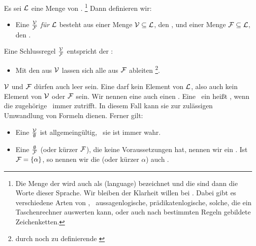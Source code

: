 Es sei $\mathcal{L}$ eine Menge von .%
	\footnote{%
	Die Menge der  wird auch als  (language) bezeichnet und die  sind dann die Worte dieser Sprache.
	Wir bleiben der Klarheit willen bei .
	Dabei gibt es verschiedene Arten von , \textzB\ aussagenlogische, prädikatenlogische, solche, die ein Taschenrechner auswerten kann, oder auch nach bestimmten Regeln gebildete Zeichenketten.
}
Dann definieren wir:
\begin{itemize}
	\item[] Eine  $\frac{\mathcal{V}}{\mathcal{F}}$ \emph{für} $\mathcal{L}$ besteht aus einer Menge $\mathcal{V}\subseteq\mathcal{L}$, den , und einer Menge $\mathcal{F}\subseteq\mathcal{L}$, den .
\end{itemize}
Eine Schlussregel $\frac{\mathcal{V}}{\mathcal{F}}$ entspricht der \Aussage:
%
\begin{itemize}
	\item[] Mit den  aus $\mathcal{V}$ lassen sich alle  aus $\mathcal{F}$ ableiten%
	\footnote{durch noch zu definierende \emph{}}.
\end{itemize}
%
$\mathcal{V}$ und $\mathcal{F}$ dürfen auch leer sein.
Eine  darf kein Element von $\mathcal{L}$, also auch kein Element von $\mathcal{V}$ oder $\mathcal{F}$ sein.
Wir nennen eine  auch einen \emph{}.
Eine  \textbzw\ ein  heißt , wenn die zugehörige \Aussage\ immer zutrifft.
In diesem Fall kann sie zur zulässigen Umwandlung von Formeln dienen.
Ferner gilt:
%
\begin{itemize}
	\item Eine  $\frac{\mathcal{V}}{\emptyset}$ ist allgemeingültig, \textdh\ sie ist immer wahr.
	\item Eine  $\frac{\emptyset}{\mathcal{F}}$ (oder kürzer $\mathcal{F}$), die keine Voraussetzungen hat, nennen wir ein .
	Ist $\mathcal{F} = \{\alpha\}$, so nennen wir die  (oder kürzer $\alpha$) auch .
\end{itemize}

